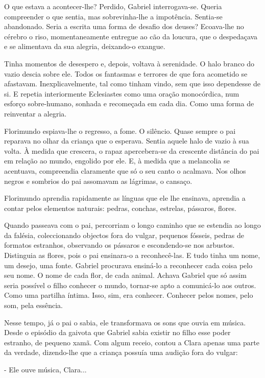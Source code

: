 O que estava a acontecer-lhe? Perdido, Gabriel interrogava-se. Queria
compreender o que sentia, mas sobrevinha-lhe a impotência. Sentia-se
abandonado. Seria a escrita uma forma de desafio dos deuses? Ecoava-lhe
no cérebro o riso, momentaneamente entregue ao cão da loucura, que o
despedaçava e se alimentava da sua alegria, deixando-o exangue.

Tinha momentos de desespero e, depois, voltava à serenidade. O halo
branco do vazio descia sobre ele. Todos os fantasmas e terrores de que
fora acometido se afastavam. Inexplicavelmente, tal como tinham vindo,
sem que isso dependesse de si. E repetia interiormente Eclesiastes como
uma oração monocórdica, num esforço sobre-humano, sonhada e recomeçada
em cada dia. Como uma forma de reinventar a alegria.

Florimundo espiava-lhe o regresso, a fome. O silêncio. Quase sempre o
pai reparava no olhar da criança que o esperava. Sentia aquele halo de
vazio à sua volta. À medida que crescera, o rapaz apercebera-se da
crescente distância do pai em relação ao mundo, engolido por ele. E, à
medida que a melancolia se acentuava, compreendia claramente que só o
seu canto o acalmava. Nos olhos negros e sombrios do pai assomavam as
lágrimas, o cansaço.

Florimundo aprendia rapidamente as línguas que ele lhe ensinava,
aprendia a contar pelos elementos naturais: pedras, conchas, estrelas,
pássaros, flores.

Quando passeava com o pai, percorriam o longo caminho que se estendia ao
longo da falésia, coleccionando objectos fora do vulgar, pequenos
fósseis, pedras de formatos estranhos, observando os pássaros e
escondendo-se nos arbustos. Distinguia as flores, pois o pai ensinara-o
a reconhecê-las. E tudo tinha um nome, um desejo, uma fonte. Gabriel
procurava ensiná-lo a reconhecer cada coisa pelo seu nome. O nome de
cada flor, de cada animal. Achava Gabriel que só assim seria possível o
filho conhecer o mundo, tornar-se apto a comunicá-lo aos outros. Como
uma partilha íntima. Isso, sim, era conhecer. Conhecer pelos nomes, pelo
som, pela essência.

Nesse tempo, já o pai o sabia, ele transformava os sons que ouvia em
música. Desde o episódio da gaivota que Gabriel sabia existir no filho
esse poder estranho, de pequeno xamã. Com algum receio, contou a Clara
apenas uma parte da verdade, dizendo-lhe que a criança possuía uma
audição fora do vulgar:

- Ele ouve música, Clara...

